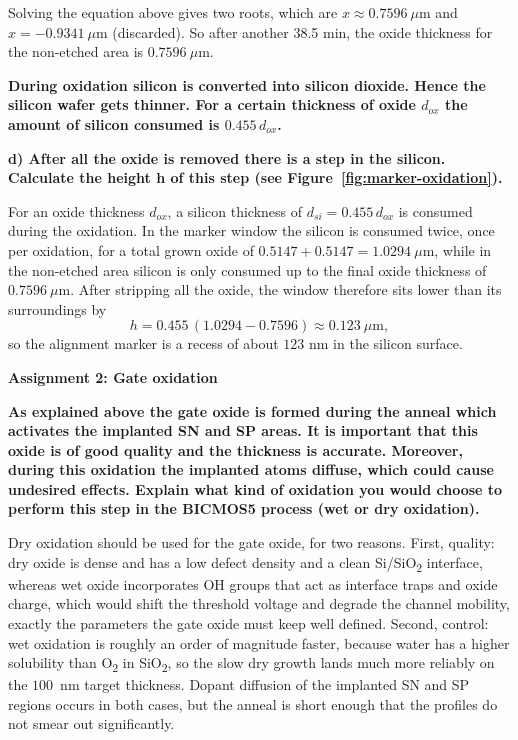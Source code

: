 Solving the equation above gives two roots, which are $x \approx 0.7596~\mu\mathrm{m}$ and $x=-0.9341~\mu\mathrm{m}$ (discarded). So after another 38.5 min, the oxide thickness for the non-etched area is $0.7596~\mu\mathrm{m}$.

\vspace{0.5em}
\noindent \textbf{During oxidation silicon is converted into silicon dioxide. Hence the silicon wafer gets thinner. For a certain thickness of oxide $d_{ox}$ the amount of silicon consumed is $0.455\,d_{ox}$.}

\noindent \textbf{d) After all the oxide is removed there is a step in the silicon. Calculate the height h of this step (see Figure~\ref{fig:marker-oxidation}).}

For an oxide thickness $d_{ox}$, a silicon thickness of $d_{si} = 0.455\,d_{ox}$ is consumed during the oxidation. In the marker window the silicon is consumed twice, once per oxidation, for a total grown oxide of $0.5147 + 0.5147 = 1.0294~\mu\mathrm{m}$, while in the non-etched area silicon is only consumed up to the final oxide thickness of $0.7596~\mu\mathrm{m}$. After stripping all the oxide, the window therefore sits lower than its surroundings by
\begin{equation}
    h = 0.455\,(1.0294-0.7596) \approx 0.123~\mu\mathrm{m},
    \label{eq:step-height}
\end{equation}
so the alignment marker is a recess of about $123$ nm in the silicon surface.

\vspace{0.5em}
\noindent \textbf{Assignment 2:  Gate oxidation}

\noindent \textbf{As explained above the gate oxide is formed during the anneal which activates the implanted SN and SP areas. It is important that this oxide is of good quality and the thickness is accurate. Moreover, during this oxidation the implanted atoms diffuse, which could cause undesired effects. Explain what kind of oxidation you would choose to perform this step in the BICMOS5 process (wet or dry oxidation).}

Dry oxidation should be used for the gate oxide, for two reasons. First, quality: dry oxide is dense and has a low defect density and a clean Si/SiO\textsubscript{2} interface, whereas wet oxide incorporates OH groups that act as interface traps and oxide charge, which would shift the threshold voltage and degrade the channel mobility, exactly the parameters the gate oxide must keep well defined. Second, control: wet oxidation is roughly an order of magnitude faster, because water has a higher solubility than O\textsubscript{2} in SiO\textsubscript{2}, so the slow dry growth lands much more reliably on the $100$~nm target thickness. Dopant diffusion of the implanted SN and SP regions occurs in both cases, but the anneal is short enough that the profiles do not smear out significantly.




